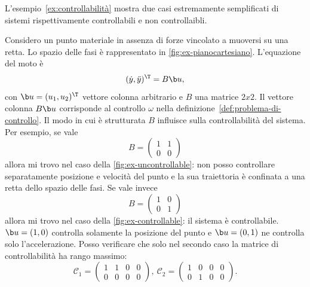 L'esempio~\ref{ex:controllabilità} mostra due casi estremamente semplificati
di sistemi rispettivamente controllabili e non controllaibli.
\begin{example}
    Considero un punto materiale in assenza di forze vincolato a muoversi su una retta.
    Lo spazio delle fasi è rappresentato in \autoref{fig:ex-pianocartesiano}.
    L'equazione del moto è
    \begin{equation*}
        (\dot y, \ddot y)^\T = B\b u,
    \end{equation*}
    con $\b u = (u_{1}, u_{2})^\T$ vettore colonna arbitrario e $B$ una matrice $2x2$.
    Il vettore colonna $B\b u$ corrisponde al
    controllo $\omega$ nella definizione~\ref{def:problema-di-controllo}.
    Il modo in cui è strutturata $B$ influisce sulla controllabilità del sistema.
    Per esempio, se vale
    \begin{equation*}
        B = \left(
        \begin{array}{cc}
            1 & 1 \\
            0 & 0
        \end{array}
        \right)
    \end{equation*}
    allora mi trovo nel caso della \autoref{fig:ex-uncontrollable}: non posso
    controllare separatamente posizione e velocità del punto e la sua traiettoria
    è confinata a una retta dello spazio delle fasi.
    Se vale invece
    \begin{equation*}
        B = \left(
        \begin{array}{cc}
            1 & 0 \\
            0 & 1
        \end{array}
        \right)
    \end{equation*}
    allora mi trovo
    nel caso della \autoref{fig:ex-controllable}: il sistema
    è controllabile. $\b u = (1, 0)$ controlla solamente la posizione del punto
    e $\b u = (0, 1)$ ne controlla solo l'accelerazione.
    Posso verificare che solo nel secondo caso la matrice di controllabilità
    ha rango massimo:
    \begin{equation*}
        \mathcal C_1 = \left(
        \begin{array}{cccc}
            1 & 1 & 0 & 0\\
            0 & 0 & 0 & 0
        \end{array}
        \right), \
        \mathcal C_2 = \left(
        \begin{array}{cccc}
            1 & 0 & 0 & 0\\
            0 & 1 & 0 & 0
        \end{array}
        \right).
    \end{equation*}


\end{example}
